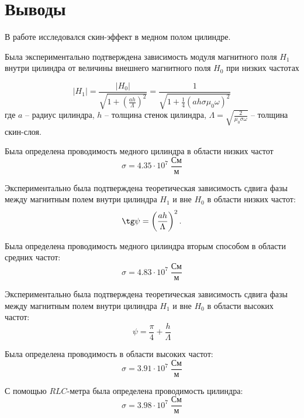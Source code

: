 \section*{Выводы}

В работе исследовался скин-эффект в медном полом цилиндре.

Была экспериментально подтверждена зависимость модуля магнитного поля $H_1$ внутри цилиндра от величины внешнего магнитного поля $H_0$ при низких частотах 

$$
|H_1| = \frac{|H_0|}{\sqrt{1 + \left( \frac{ah}{\Lambda} \right)^2}} = \frac{1}{\sqrt{1 + \frac{1}{4} \left( a h \sigma \mu_0 \omega \right)^2}}
$$
где $a$ -- радиус цилиндра, $h$ -- толщина стенок цилиндра, $\Lambda = \sqrt{\frac{2}{\mu_0 \sigma \omega}}$ -- толщина скин-слоя.

Была определена проводимость медного цилиндра в области низких частот $$
\sigma = 4.35 \cdot 10^7 \; \frac{См}{м}
$$

Экспериментально была подтверждена теоретическая зависимость сдвига фазы между магнитным полем внутри цилиндра $H_1$ и вне $H_0$ в области низких частот:
$$
\tg \psi = \left( \frac{ah}{\Lambda} \right)^2.
$$

Была определена проводимость медного цилиндра вторым способом в области средних частот:
$$
\sigma = 4.83 \cdot 10^7 \; \frac{См}{м}
$$

Экспериментально была подтверждена теоретическая зависимость сдвига фазы между магнитным полем внутри цилиндра $H_1$ и вне $H_0$ в области высоких частот:
$$
\psi = \frac{\pi}{4} + \frac{h}{\Lambda}
$$

Была определена проводимость в области высоких частот:
$$
\sigma = 3.91 \cdot 10^7 \; \frac{См}{\text{м}}
$$

С помощью $RLC$-метра была определена проводимость цилиндра:
$$
\sigma = 3.98 \cdot 10^7 \; \frac{\text{См}}{\text{м}}
$$

